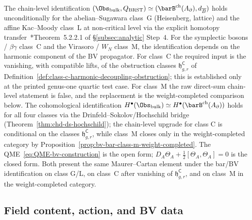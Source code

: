 \begin{remark}[BV $=$ bar scope: class G/L proved, class C/M conditional]
\label{rem:bv-equals-bar-scope}
The chain-level identification $(\Obs_{\mathrm{bulk}}, Q_{\mathrm{BRST}})
\simeq (\barB^{\mathrm{ch}}(A_\partial), d_{\overline B})$ holds
unconditionally for the abelian--Sugawara class~G (Heisenberg, lattice)
and the affine Kac--Moody class~L at non-critical level via the explicit
homotopy transfer~\cite{CG17}*{Theorem~5.2.2.1} of
\S\ref{subsec:analytic} Step~4. For the symplectic bosons /
$\beta\gamma$ class~C and the Virasoro / $W_N$ class~M, the
identification depends on the harmonic component of the BV propagator.
For class~C the required input is the vanishing, with compatible lifts,
of the obstruction classes
\(\mathfrak h_{g,r}^{\mathsf C}\) of
Definition~\ref{def:class-c-harmonic-decoupling-obstruction}; this is
established only at the printed genus-one quartic test case. For
class~M the raw direct-sum chain-level statement is false, and the
replacement is the weight-completed comparison below. The cohomological identification
$H^\bullet(\Obs_{\mathrm{bulk}}) \simeq
H^\bullet(\barB^{\mathrm{ch}}(A_\partial))$ holds for all four classes
via the Drinfeld--Sokolov/Hochschild bridge
(Theorem~\ref{thm:chd-ds-hochschild}); the chain-level upgrade for class
C is conditional on the classes \(\mathfrak h_{g,r}^{\mathsf C}\),
while class~M closes only in the weight-completed category by
Proposition~\ref{prop:bv-bar-class-m-weight-completed}. The
QME~\eqref{eq:QME-bv-construction} is the open form;
$D_A\Theta_A + \tfrac12[\Theta_A, \Theta_A] = 0$ is the closed form. Both
present the same Maurer--Cartan element under the bar/BV identification on
class G/L, on class~C after vanishing of
\(\mathfrak h_{g,r}^{\mathsf C}\), and on class~M in the
weight-completed category.
\end{remark}

\subsection{Field content, action, and BV data}
\label{subsec:BV-data}

